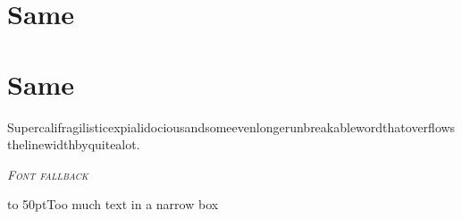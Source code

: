 \documentclass{article}
\begin{document}
\section{Same}\label{dup}
\section{Same}\label{dup}
\noindent Supercalifragilisticexpialidociousandsomeevenlongerunbreakablewordthatoverflowsthelinewidthbyquitealot.

\textit{\textsf{\textsc{Font fallback}}}

\hbox to 50pt{Too much text in a narrow box}
\end{document}
